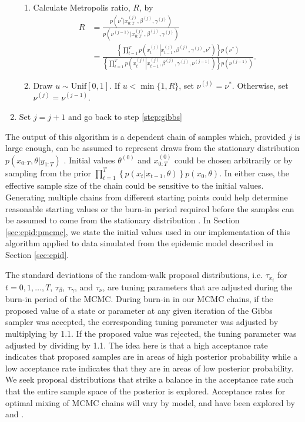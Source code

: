 \begin{enumerate}
\begin{enumerate}
    \item Calculate Metropolis ratio, $R$, by
    \begin{align*}
    R &=     \frac{p\left(\nu^*|x_{0:T}^{(j)},\beta^{(j)},\gamma^{(j)}\right)}{p\left(\nu^{(j-1)}|x_{0:T}^{(j)},\beta^{(j)},\gamma^{(j)}\right)} \\
     &= \frac{\left\{\prod_{t=1}^T p\left(x^{(j)}_t\left|x^{(j)}_{t-1},\beta^{(j)},\gamma^{(j)},\nu^*\right.\right)\right\}p(\nu^*)}{\left\{\prod_{t=1}^T p\left(x^{(j)}_t\left|x^{(j)}_{t-1},\beta^{(j)},\gamma^{(j)},\nu^{(j-1)}\right.\right)\right\}p\left(\nu^{(j-1)}\right)}.
    \end{align*}
    \item Draw $u \sim \mbox{Unif}[0,1]$. If $u < \min\{1, R\}$, set $\nu^{(j)} = \nu^*$. Otherwise, set $\nu^{(j)} = \nu^{(j-1)}$.
    \end{enumerate}
\item Set $j = j + 1$ and go back to step \ref{step:gibbs}
\end{enumerate}

The output of this algorithm is a dependent chain of samples which, provided $j$ is large enough, can be assumed to represent draws from the stationary distribution $p(x_{0:T},\theta|y_{1:T})$ \cite[Chapter 7][]{Robe:Case:mont:2004}. Initial values $\theta^{(0)}$ and $x_{0:T}^{(0)}$ could be chosen arbitrarily or by sampling from the prior $\prod_{t=1}^T\left\{p(x_t|x_{t-1},\theta)\right\}p(x_0,\theta)$. In either case, the effective sample size of the chain could be sensitive to the initial values. Generating multiple chains from different starting points could help determine reasonable starting values or the burn-in period required before the samples can be assumed to come from the stationary distribution \citep{giv:hoet:2005:comp}. In Section \ref{sec:epid:pmcmc}, we state the initial values used in our implementation of this algorithm applied to data simulated from the epidemic model described in Section \ref{sec:epid}.

The standard deviations of the random-walk proposal distributions, i.e. $\tau_{x_t}$ for $t = 0,1,\ldots,T$, $\tau_{\beta}$, $\tau_{\gamma}$, and $\tau_{\nu}$, are tuning parameters that are adjusted during the burn-in period of the MCMC. During burn-in in our MCMC chains, if the proposed value of a state or parameter at any given iteration of the Gibbs sampler was accepted, the corresponding tuning parameter was adjusted by multiplying by 1.1. If the proposed value was rejected, the tuning parameter was adjusted by dividing by 1.1. The idea here is that a high acceptance rate indicates that proposed samples are in areas of high posterior probability while a low acceptance rate indicates that they are in areas of low posterior probability. We seek proposal distributions that strike a balance in the acceptance rate such that the entire sample space of the posterior is explored. Acceptance rates for optimal mixing of MCMC chains will vary by model, and have been explored by \citet{Robe:Gel:gilks:1997:optmh} and \citet{bed:2008:optmh}.

